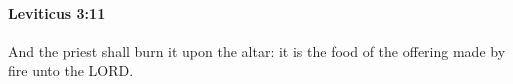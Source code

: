 
		\paragraph{Leviticus 3:11} %
			\label{LEVITICUS-3-11}

			And the priest shall burn it upon the altar: it is the food of the offering made by fire unto the LORD.


